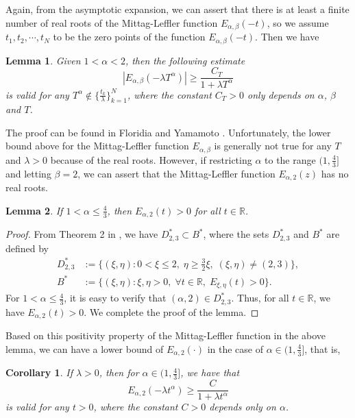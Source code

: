 \documentclass[11pt]{article}
\newtheorem{lemma}{Lemma}[section]
\newtheorem{corollary}{Corollary}[section]
\numberwithin{equation}{section}
\begin{document}
Again, from the asymptotic expansion, we can assert that there is at least a finite number of real roots of the Mittag-Leffler function $E_{\alpha,\beta}(-t)$, so we assume $t_1, t_2, \cdots, t_N$ to be the zero points of the function $E_{\alpha,\beta}(-t)$. Then we have
\begin{lemma}\label{lem-ml2-lower}
Given $1< \alpha < 2$, then the following estimate
\[
|E_{\alpha, \beta}(-\lambda T^{\alpha})| \geq \frac{C_T}{1+\lambda T^\alpha}
\]
is valid for any $T^\alpha \not\in \{\frac{t_k}{\lambda}\}_{k=1}^N$, where the constant $C_T>0$ only depends on $\alpha$, $\beta$ and $T$.
\end{lemma}
The proof can be found in Floridia and Yamamoto \cite{floridia2020backward}. Unfortunately, the lower bound above for the Mittag-Leffler function $E_{\alpha,\beta}$ is generally not true for any $T$ and $\lambda>0$ because of the real roots.
However, if restricting $\alpha$ to the range $(1,\frac43]$ and letting $\beta=2$, we can assert that the Mittag-Leffler function $E_{\alpha,2}(z)$ has no real roots.
\begin{lemma}\label{lem-Ea2}
If $ 1 < \alpha \leq \frac{4}{3} $, then $ E_{\alpha, 2}(t) > 0 $ for all $ t \in \mathbb{R} $.
\end{lemma}
\begin{proof}
From Theorem 2 in \cite{pskhu2005real}, we have $
D_{2, 3}^* \subset B^*$, where the sets $D_{2,3}^*$ and $B^*$ are defined by
\begin{align*}
 D_{2, 3}^* & := \{ (\xi, \eta) : 0 < \xi \leq 2, \; \eta \geq \frac{3}{2}\xi, \; (\xi, \eta) \neq (2, 3) \}, \\
 B^* & := \{ (\xi, \eta) : \xi, \eta > 0, \; \forall t \in \mathbb{R}, \; E_{\xi, \eta}(t) > 0 \}.
\end{align*}
For $ 1 < \alpha \le\frac{4}{3} $, it is easy to verify that $ (\alpha, 2) \in D_{2, 3}^* $. Thus, for all $ t \in \mathbb{R} $, we have $ E_{\alpha, 2}(t) > 0 $. We complete the proof of the lemma.
\end{proof}
Based on this positivity property of the Mittag-Leffler function in the above lemma, we can have a lower bound of $E_{\alpha,2}(\cdot)$ in the case of $\alpha\in(1,\frac43]$, that is,
\begin{corollary}\label{coro-ml-lower43}
If $\lambda > 0$, then for $\alpha \in (1,\frac{4}{3} ]$, we have that
\[
E_{\alpha, 2}(-\lambda t^{\alpha}) \geq \frac{C}{1 + \lambda t^\alpha}
\]
is valid for any $t>0$, where the constant $C>0$ depends only on $\alpha$.
\end{corollary}
\end{document}
